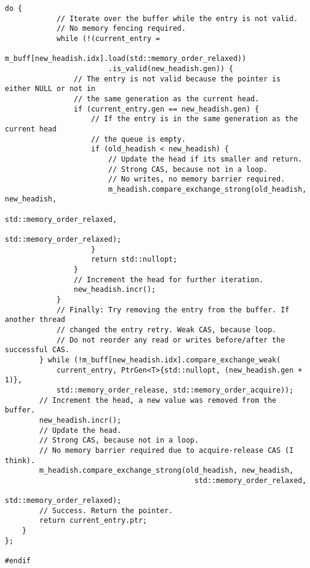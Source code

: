 \begin{lstlisting}[caption={Van Eerd's "An Interesting Lock-free Queue"},label=append_mpmc]
        do {
            // Iterate over the buffer while the entry is not valid.
            // No memory fencing required.
            while (!(current_entry =
                        m_buff[new_headish.idx].load(std::memory_order_relaxed))
                        .is_valid(new_headish.gen)) {
                // The entry is not valid because the pointer is either NULL or not in
                // the same generation as the current head.
                if (current_entry.gen == new_headish.gen) {
                    // If the entry is in the same generation as the current head
                    // the queue is empty.
                    if (old_headish < new_headish) {
                        // Update the head if its smaller and return.
                        // Strong CAS, because not in a loop.
                        // No writes, no memory barrier required.
                        m_headish.compare_exchange_strong(old_headish, new_headish,
                                                            std::memory_order_relaxed,
                                                            std::memory_order_relaxed);
                    }
                    return std::nullopt;
                }
                // Increment the head for further iteration.
                new_headish.incr();
            }
            // Finally: Try removing the entry from the buffer. If another thread
            // changed the entry retry. Weak CAS, because loop.
            // Do not reorder any read or writes before/after the successful CAS.
        } while (!m_buff[new_headish.idx].compare_exchange_weak(
            current_entry, PtrGen<T>{std::nullopt, (new_headish.gen + 1)},
            std::memory_order_release, std::memory_order_acquire));
        // Increment the head, a new value was removed from the buffer.
        new_headish.incr();
        // Update the head.
        // Strong CAS, because not in a loop.
        // No memory barrier required due to acquire-release CAS (I think).
        m_headish.compare_exchange_strong(old_headish, new_headish,
                                            std::memory_order_relaxed,
                                            std::memory_order_relaxed);
        // Success. Return the pointer.
        return current_entry.ptr;
    }
};

#endif
\end{lstlisting}
